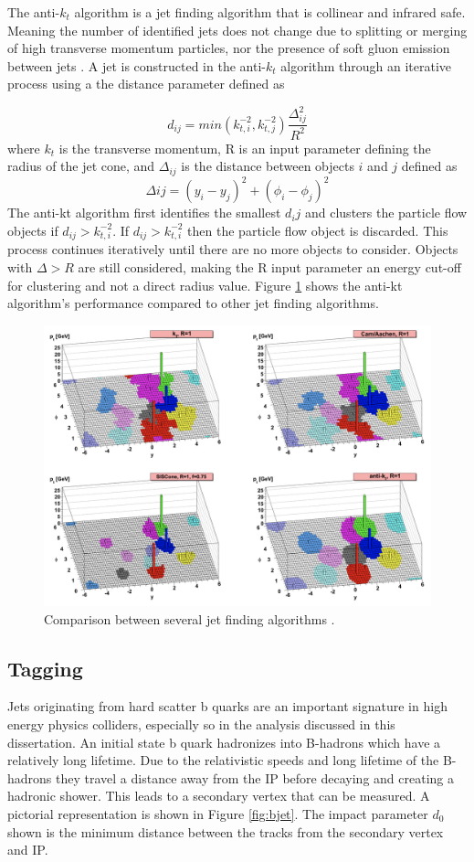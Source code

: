 	The anti-$k_t$ algorithm is a jet finding algorithm that is collinear and infrared safe. Meaning the number of identified jets does not change due to splitting or merging of high transverse momentum particles, nor the presence of soft gluon emission between jets \cite{Cacciari_2008}. A jet is constructed in the anti-$k_t$ algorithm through an iterative process using a the distance parameter defined as 

	\begin{equation}\label{eqn:anti-kt-distance}
	d_{ij} = min(k_{t,i}^{-2} , k_{t,j}^{-2}) \frac{\Delta_{ij}^{2}}{R^2} 
	\end{equation}
	where $k_t$ is the transverse momentum, R is an input parameter defining the radius of the jet cone, and $\Delta_{ij}$ is the distance between objects $i$ and $j$ defined as
	\begin{equation}\label{eqn:anti-kt-delta}
	\Delta{ij} = (y_i - y_j)^2 + (\phi_i - \phi_j)^2
	\end{equation}
	The anti-kt algorithm first identifies the smallest $d_ij$ and clusters the particle flow objects if $d_{ij}>k_{t,i}^{-2}$. If $d_{ij}>k_{t,i}^{-2}$ then the particle flow object is discarded. This process continues iteratively until there are no more objects to consider. Objects with $\Delta>R$ are still considered, making the R input parameter an energy cut-off for clustering and not a direct radius value. Figure \ref{fig:anti-kt-comparison} shows the anti-kt algorithm's performance compared to other jet finding algorithms.

	\begin{figure}[!ht]
	\centering
	\includegraphics[width=.5\textwidth,keepaspectratio=true]{chapters/chapter5_eventreconnstruction/images/anti-kt-comparison.png}
	\caption{\label{fig:anti-kt-comparison} Comparison between several jet finding algorithms \cite{anti-kt}.}
	\end{figure}

		\subsection{\bjet Tagging}\label{ssec:flavor-tagging}
		Jets originating from hard scatter b quarks are an important signature in high energy physics colliders, especially so in the analysis discussed in this dissertation. An initial state b quark hadronizes into B-hadrons which have a relatively long lifetime. Due to the relativistic speeds and long lifetime of the B-hadrons they travel a distance away from the IP before decaying and creating a hadronic shower. This leads to a secondary vertex that can be measured. A pictorial representation is shown in Figure \ref{fig:bjet}. The impact parameter $d_0$ shown is the minimum distance between the tracks from the secondary vertex and IP. 

